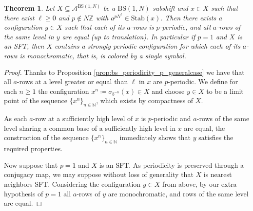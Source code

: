 \documentclass{aims}
\newcommand{\BS}[1][N]{\mathrm{BS}(1,#1)}
\newtheorem{theorem}{Theorem}[section]
\theoremstyle{definition}
\begin{document}
\begin{theorem}\label{thm:subshift_with_configuration_rows_p_periodic_and_SFT}
	Let $X\subseteq \mathcal{A}^{\BS}$ be a $\BS$-subshift and $x\in X$ such that there exist $\ell\ge 0$ and $p\notin N\mathbb{Z}$ with $a^{pN^{\ell}}\in \mathrm{Stab}(x)$. Then there exists a configuration $y\in X$ such that each of its $a$-rows is $p$-periodic, and all $a$-rows of the same level in $y$ are equal (up to translation). In particular if $p=1$ and $X$ is an SFT, then $X$ contains a strongly periodic configuration for which each of its $a$-rows is monochromatic, that is, is colored by a single symbol.
\end{theorem}
\begin{proof}
	Thanks to Proposition \ref{prop:bs_periodicity_p_generalcase} we have that all $a$-rows at a level greater or equal than $\ell$ in $x$ are $p$-periodic. We define for each $n\ge 1$ the configuration $x^n\coloneqq\sigma_{b^{-n}}(x)\in X$ and choose $y\in X$ to be a limit point of the sequence $\{x^n\}_{n\in \mathbb{N}}$, which exists by compactness of $X$. 
	
	
	As each $a$-row at a sufficiently high level of $x$ is $p$-periodic and $a$-rows of the same level sharing a common base of a sufficiently high level in $x$ are equal, the construction of the sequence $\{x^n\}_{n\in \mathbb{N}}$ immediately shows that $y$ satisfies the required properties.
	
	Now suppose that $p=1$ and $X$ is an SFT. As periodicity is preserved through a conjugacy map, we may suppose without loss of generality that $X$ is nearest neighbors SFT. Considering the configuration $y\in X$ from above, by our extra hypothesis of $p=1$ all $a$-rows of $y$ are monochromatic, and rows of the same level are equal.
	

\end{proof}
\end{document}
